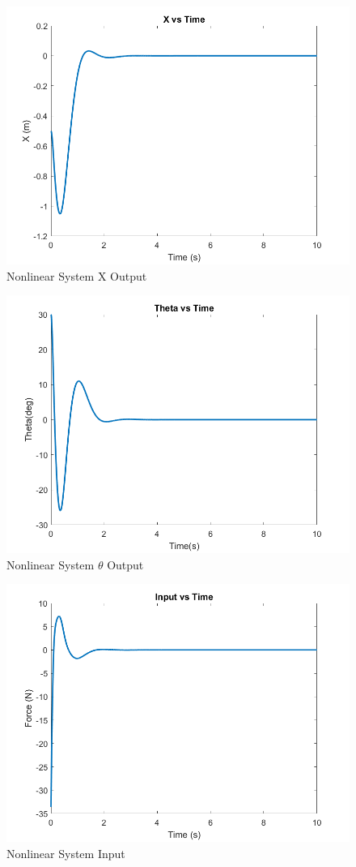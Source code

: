 \begin{figure}[!ht]
    \centering
    \includegraphics[width=\linewidth]{figs/sfsp_nlin_x.png}
    \caption{Nonlinear System X Output}
    \label{}
\end{figure}

\begin{figure}[!ht]
    \centering
    \includegraphics[width=\linewidth]{figs/sfsp_nlin_theta.png}
    \caption{Nonlinear System $\theta$ Output}
    \label{}
\end{figure}

\begin{figure}[!ht]
    \centering
    \includegraphics[width=\linewidth]{figs/sfsp_nlin_input.png}
    \caption{Nonlinear System Input}
    \label{}
\end{figure}


